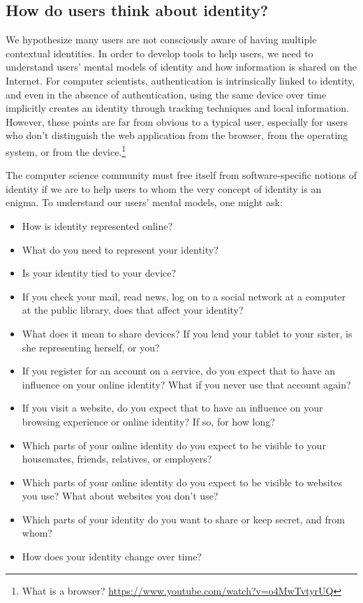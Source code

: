 \documentclass[10pt, conference, compsocconf]{IEEEtran}
\begin{document}
\subsection{How do users think about identity?}
We hypothesize many users are not consciously aware of having multiple
contextual identities. In order to develop tools to help users, we need to
understand users' mental models of identity and how information is shared on
the Internet. For computer scientists, authentication is intrinsically linked
to identity, and even in the absence of authentication, using the same device
over time implicitly creates an identity through tracking techniques and local
information. However, these points are far from obvious to a typical user,
especially for users who don't distinguish the web application from the
browser, from the operating system, or from the device.\footnote{What is a
browser? \url{https://www.youtube.com/watch?v=o4MwTvtyrUQ}}

The computer science community must free itself from software-specific
notions of identity if we are to help users to whom the very concept of
identity is an enigma. To understand our users' mental models,
one might ask:

\begin{itemize}
\item How is identity represented online?
\item What do you need to represent your identity?
\item Is your identity tied to your device?
\item If you check your mail, read news, log on to a social network at a
computer at the public library, does that affect your identity?
\item What does it mean to share devices? If you lend your tablet to your
sister, is she representing herself, or you?
\item If you register for an account on a service, do you expect that to have
an influence on your online identity? What if you never use that account again?
\item If you visit a website, do you expect that to have an influence on your
browsing experience or online identity? If so, for how long?
\item Which parts of your online identity do you expect to be visible to
your housemates, friends, relatives, or employers?
\item Which parts of your online identity do you expect to be visible to
websites you use? What about websites you don't use?
\item Which parts of your identity do you want to share or keep secret, and from whom?
\item How does your identity change over time?
\end{itemize}
\end{document}
